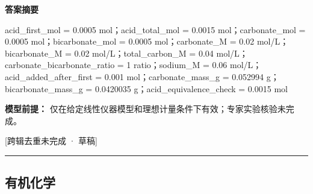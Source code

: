 \documentclass[UTF8,11pt,a4paper]{ctexart}
\begin{document}
\noindent\textbf{答案摘要}\par
acid\_first\_mol = 0.0005 mol；acid\_total\_mol = 0.0015 mol；carbonate\_mol = 0.0005 mol；bicarbonate\_mol = 0.0005 mol；carbonate\_M = 0.02 mol/L；bicarbonate\_M = 0.02 mol/L；total\_carbon\_M = 0.04 mol/L；carbonate\_bicarbonate\_ratio = 1 ratio；sodium\_M = 0.06 mol/L；acid\_added\_after\_first = 0.001 mol；carbonate\_mass\_g = 0.052994 g；bicarbonate\_mass\_g = 0.0420035 g；acid\_equivalence\_check = 0.0015 mol\par
\noindent\textbf{模型前提：}
仅在给定线性仪器模型和理想计量条件下有效；专家实验核验未完成。\par
\noindent\textcolor{red!65!black}{[跨辑去重未完成 · 草稿]} \par
\medskip\hrule\medskip
\subsection*{有机化学}
\end{document}
